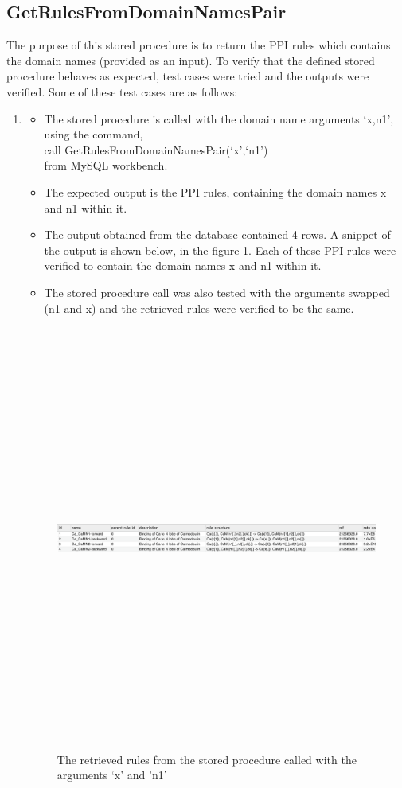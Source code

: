 \documentclass[msc,deptreport,ai]{infthesis}      %
\begin{document}
\subsection{GetRulesFromDomainNamesPair}
The purpose of this stored procedure is to return the PPI rules which contains the domain  names (provided as an input). To verify that the defined stored procedure behaves as expected, test cases were tried and the outputs were verified. Some of these test cases are as follows: 
\begin{enumerate}
	\item 
	\begin{itemize}
		\item 	The stored procedure is called with the domain name arguments `x,n1', using the command, \\
		call GetRulesFromDomainNamesPair(`x',`n1')\\
		from MySQL workbench. 
		\item The expected output is the PPI rules, containing the domain names x and n1 within it.
		\item The output obtained from the database contained 4 rows. A snippet of the output is shown below, in the figure \ref{fig:DomainNameOutput1}. Each of these PPI rules were verified to contain the domain names x and n1 within it.
		\item The stored procedure call was also tested with the arguments swapped (n1 and x) and the retrieved rules were verified to be the same.		
	\end{itemize}
	\begin{figure}[H]
		\centering
		\captionsetup{justification=centering}
		\includegraphics[width=\linewidth,height=14cm,keepaspectratio]{DomainNameOutput1.png}	
		\caption{The retrieved rules from the stored procedure called with the arguments `x' and 'n1'}
		\label{fig:DomainNameOutput1}		
	\end{figure}


\end{enumerate}
\end{document}
